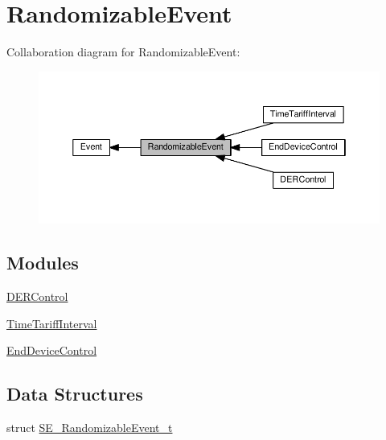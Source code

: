 \hypertarget{group__RandomizableEvent}{}\section{Randomizable\+Event}
\label{group__RandomizableEvent}
Collaboration diagram for Randomizable\+Event\+:\nopagebreak
\begin{figure}[H]
\begin{center}
\leavevmode
\includegraphics[width=350pt]{group__RandomizableEvent}
\end{center}
\end{figure}
\subsection*{Modules}
\begin{DoxyCompactItemize}
\item 
\hyperlink{group__DERControl}{D\+E\+R\+Control}
\item 
\hyperlink{group__TimeTariffInterval}{Time\+Tariff\+Interval}
\item 
\hyperlink{group__EndDeviceControl}{End\+Device\+Control}
\end{DoxyCompactItemize}
\subsection*{Data Structures}
\begin{DoxyCompactItemize}
\item 
struct \hyperlink{structSE__RandomizableEvent__t}{S\+E\+\_\+\+Randomizable\+Event\+\_\+t}
\end{DoxyCompactItemize}
